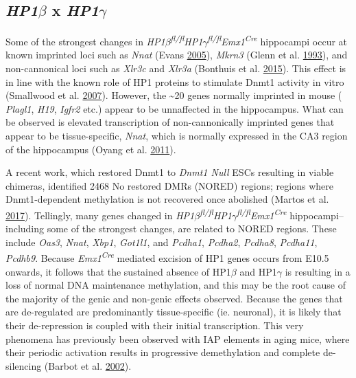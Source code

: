 \documentclass[onehalf,12pt]{beavtex}
\begin{document}
  \subsection*{\texorpdfstring{\emph{HP1\(\beta\)} x
  \emph{HP1\(\gamma\)}}{HP1\textbackslash{}beta x HP1\textbackslash{}gamma}}\label{hp1beta-x-hp1gamma}
  
  Some of the strongest changes in
  \emph{HP1\(\beta\)\textsuperscript{fl/fl}HP1\(\gamma\)\textsuperscript{fl/fl}Emx1\textsuperscript{Cre}}
  hippocampi occur at known imprinted loci such as \emph{Nnat} (Evans
  \protect\hyperlink{ref-EvansComparativePhylogeneticAnalysis2005}{2005}),
  \emph{Mkrn3} (Glenn et al.
  \protect\hyperlink{ref-GlennModification15q11q13DNA1993}{1993}), and
  non-cannonical loci such as \emph{Xlr3c} and \emph{Xlr3a} (Bonthuis et
  al.
  \protect\hyperlink{ref-BonthuisNoncanonicalGenomicImprinting2015}{2015}).
  This effect is in line with the known role of HP1 proteins to stimulate
  Dnmt1 activity in vitro (Smallwood et al.
  \protect\hyperlink{ref-SmallwoodFunctionalcooperationHP12007}{2007}).
  However, the \textasciitilde{}20 genes normally imprinted in mouse (
  \emph{Plagl1}, \emph{H19}, \emph{Igfr2} etc.) appear to be unnaffected
  in the hippocampus. What can be observed is elevated transcription of
  non-cannonically imprinted genes that appear to be tissue-specific,
  \emph{Nnat}, which is normally expressed in the CA3 region of the
  hippocampus (Oyang et al.
  \protect\hyperlink{ref-OyangFunctionalCharacterizationDendritically2011}{2011}).
  
  A recent work, which restored Dnmt1 to \emph{Dnmt1 Null} ESCs resulting
  in viable chimeras, identified 2468 No restored DMRs (NORED) regions;
  regions where Dnmt1-dependent methylation is not recovered once
  abolished (Martos et al.
  \protect\hyperlink{ref-MartosTwoapproachesreveal2017}{2017}). Tellingly,
  many genes changed in
  \emph{HP1\(\beta\)\textsuperscript{fl/fl}HP1\(\gamma\)\textsuperscript{fl/fl}Emx1\textsuperscript{Cre}}
  hippocampi--including some of the strongest changes, are related to
  NORED regions. These include \emph{Oas3}, \emph{Nnat}, \emph{Xbp1},
  \emph{Got1l1}, and \emph{Pcdha1}, \emph{Pcdha2}, \emph{Pcdha8},
  \emph{Pcdha11}, \emph{Pcdhb9}. Because \emph{Emx1\textsuperscript{Cre}}
  mediated excision of HP1 genes occurs from E10.5 onwards, it follows
  that the sustained absence of HP1\(\beta\) and HP1\(\gamma\) is
  resulting in a loss of normal DNA maintenance methylation, and this may
  be the root cause of the majority of the genic and non-genic effects
  observed. Because the genes that are de-regulated are predominantly
  tissue-specific (ie. neuronal), it is likely that their de-repression is
  coupled with their initial transcription. This very phenomena has
  previously been observed with IAP elements in aging mice, where their
  periodic activation results in progressive demethylation and complete
  de-silencing (Barbot et al.
  \protect\hyperlink{ref-BarbotEpigeneticregulationIAP2002}{2002}).
  
\end{document}
